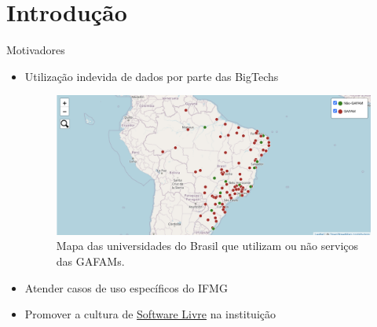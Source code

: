 \AtBeginSection[]{
	\begin{frame}
		\frametitle{}
		\tableofcontents[currentsection]
	\end{frame}
}

\section{Introdução}
\begin{frame}{Motivadores}
	\begin{itemize}[<+->]
		\item Utilização indevida de dados por parte das BigTechs
		\begin{minipage}{\linewidth}
			\begin{figure}
				\centering
				\includegraphics[width=\textwidth]{images/gafam-map.png}
				\caption{Mapa das universidades do Brasil que utilizam ou não serviços das GAFAMs.}
			\end{figure}
		\end{minipage}
		\item Atender casos de uso específicos do IFMG
		\item Promover a cultura de \href{https://www.gnu.org/philosophy/free-sw.pt-br.html}{Software Livre} na instituição
	\end{itemize}
\end{frame}